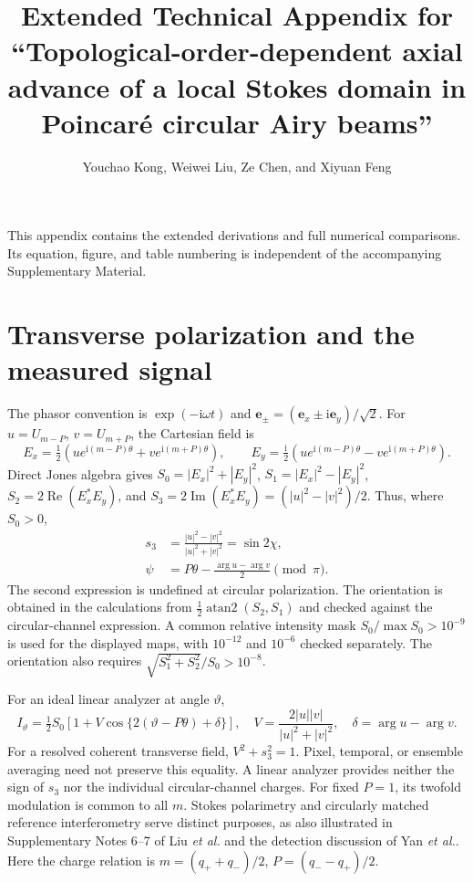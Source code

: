 \documentclass[11pt,a4paper]{article}
\title{Extended Technical Appendix for ``Topological-order-dependent axial advance of a local Stokes domain in Poincar\'e circular Airy beams''}
\author{Youchao Kong, Weiwei Liu, Ze Chen, and Xiyuan Feng}
\date{}
\newcommand{\ii}{\mathrm{i}}
\begin{document}
\maketitle

This appendix contains the extended derivations and full numerical comparisons. Its equation, figure, and table numbering is independent of the accompanying Supplementary Material.


\section{Transverse polarization and the measured signal}
The phasor convention is $\exp(-\ii\omega t)$ and
$\bm e_\pm=(\bm e_x\pm\ii\bm e_y)/\sqrt2$.
For $u=U_{m-P}$, $v=U_{m+P}$, the Cartesian field is
\begin{equation}
E_x=\tfrac12(ue^{\ii(m-P)\theta}+ve^{\ii(m+P)\theta}),\qquad
E_y=\tfrac{\ii}{2}(ue^{\ii(m-P)\theta}-ve^{\ii(m+P)\theta}).
\end{equation}
Direct Jones algebra gives $S_0=|E_x|^2+|E_y|^2$,
$S_1=|E_x|^2-|E_y|^2$, $S_2=2\operatorname{Re}(E_x^*E_y)$, and
$S_3=2\operatorname{Im}(E_x^*E_y)=(|u|^2-|v|^2)/2$.
Thus, where $S_0>0$,
\begin{equation}
\begin{aligned}
s_3&=\frac{|u|^2-|v|^2}{|u|^2+|v|^2}=\sin 2\chi,\\
\psi&=P\theta-\frac{\arg u-\arg v}{2}\pmod\pi.
\end{aligned}
\end{equation}
The second expression is undefined at circular polarization. The orientation
is obtained in the calculations from $\frac12\operatorname{atan2}(S_2,S_1)$
and checked against the circular-channel expression. A common relative
intensity mask $S_0/\max S_0>10^{-9}$ is used for the displayed maps, with
$10^{-12}$ and $10^{-6}$ checked separately. The orientation also requires
$\sqrt{S_1^2+S_2^2}/S_0>10^{-8}$.

For an ideal linear analyzer at angle $\vartheta$,
\begin{equation}
I_\vartheta=\tfrac12S_0[1+V\cos\{2(\vartheta-P\theta)+\delta\}],
\quad V=\frac{2|u||v|}{|u|^2+|v|^2},\quad\delta=\arg u-\arg v.
\end{equation}
For a resolved coherent transverse field, $V^2+s_3^2=1$. Pixel, temporal,
or ensemble averaging need not preserve this equality. A linear analyzer
provides neither the sign of $s_3$ nor the individual circular-channel charges.
For fixed $P=1$, its twofold modulation is common to all $m$. Stokes
polarimetry and circularly matched reference interferometry serve distinct
purposes, as also illustrated in Supplementary Notes 6--7 of Liu
\emph{et al.}\cite{Liu2021} and the detection discussion of Yan
\emph{et al.}\cite{Yan2025}. Here the charge relation is
$m=(q_++q_-)/2$, $P=(q_--q_+)/2$.
\end{document}
